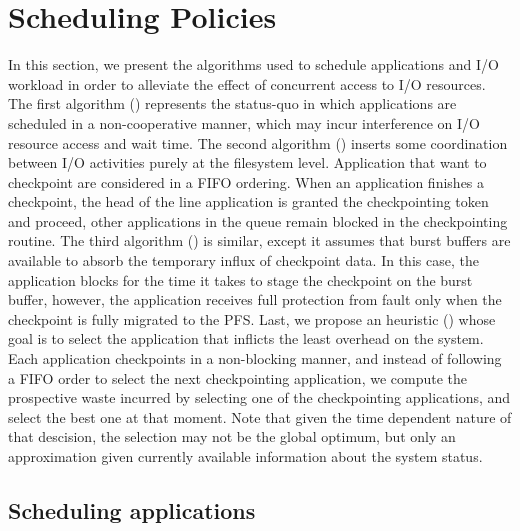 
\section{Scheduling Policies}\label{sec:algorithms}

In this section, we present the algorithms used to schedule applications
and I/O workload in order to alleviate the effect of concurrent access
to I/O resources. The first algorithm (\nocoop) represents the status-quo  in
which applications are scheduled in a non-cooperative manner, which may
incur interference on I/O resource access and wait time. The second
algorithm (\fifoblock) inserts some coordination between I/O activities purely at
the filesystem level. Application that want to checkpoint are considered in
a FIFO ordering. When an application finishes a checkpoint, the head of
the line application is granted the checkpointing token and proceed,
other applications in the queue remain blocked in the checkpointing
routine. The third algorithm (\fifononblock) is similar, except it assumes
that burst buffers are available to absorb the temporary influx of
checkpoint data. In this case, the application blocks for the time it
takes to stage the checkpoint on the burst buffer, however, the application
receives full protection from fault only when the checkpoint is fully
migrated to the PFS. Last, we propose an heuristic (\leastwaste) whose goal is to
select the application that inflicts the least overhead on the system.
Each application checkpoints in a non-blocking manner, and instead of
following a FIFO order to select the next checkpointing application,
we compute the prospective waste incurred by selecting one of the
checkpointing applications, and select the best one at that moment. Note
that given the time dependent nature of that descision, the selection may
not be the global optimum, but only an approximation given currently
available information about the system status.

\subsection{Scheduling applications}

